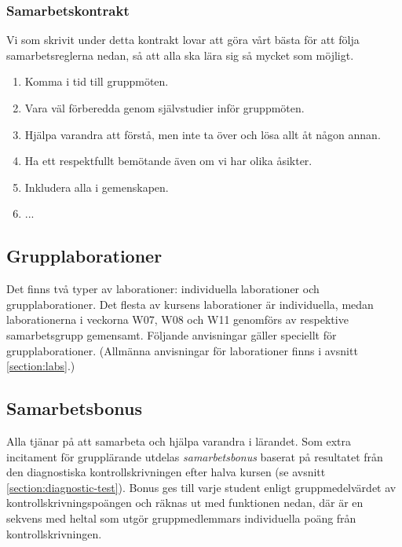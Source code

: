 \begin{tcolorbox}%
\subsubsection*{Samarbetskontrakt}
Vi som skrivit under detta kontrakt lovar att göra vårt bästa för att följa samarbetsreglerna nedan, så att alla ska lära sig så mycket som möjligt.
\begin{enumerate}
\item Komma i tid till gruppmöten.
\item Vara väl förberedda genom självstudier inför gruppmöten.
\item Hjälpa varandra att förstå, men inte ta över och lösa allt åt någon annan.
\item Ha ett respektfullt bemötande även om vi har olika åsikter.
\item Inkludera alla i gemenskapen.
\item ...
\end{enumerate}
\end{tcolorbox}
\subsection{Grupplaborationer}\label{subsection:grouplabs}



Det finns två typer av laborationer: individuella laborationer och grupplaborationer. Det flesta av kursens laborationer är individuella, medan laborationerna i veckorna W07, W08 och W11 genomförs av respektive samarbetsgrupp gemensamt. Följande anvisningar gäller speciellt för grupplaborationer. (Allmänna anvisningar för laborationer finns i avsnitt \ref{section:labs}.)

\begin{enumerate}

\end{enumerate}

\subsection{Samarbetsbonus}\label{section:bonus}

Alla tjänar på att samarbeta och hjälpa varandra i lärandet. Som extra incitament för grupplärande utdelas \emph{samarbetsbonus} baserat på resultatet från den diagnostiska kontrollskrivningen efter halva kursen (se avsnitt \ref{section:diagnostic-test}). Bonus ges till varje student enligt gruppmedelvärdet av kontrollskrivningspoängen och räknas ut med funktionen  nedan, där  är en sekvens med heltal som utgör gruppmedlemmars individuella poäng från kontrollskrivningen.

